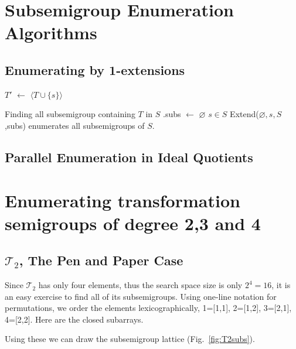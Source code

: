 \documentclass{amsart}
\newcommand{\cT}{{\mathcal T}}
\theoremstyle{plain}
\theoremstyle{definition}
\begin{document}
\section{Subsemigroup Enumeration Algorithms}

\subsection{Enumerating by 1-extensions}

\begin{algorithm}
\BlankLine
\Name{}

$T'$ $\leftarrow$ $\langle T\cup\{s\}\rangle$\\
\caption{Finding all subsemigroup containing $T$ in $S$ .\textsf{subs} $\leftarrow$ $\varnothing$ $s\in S$ \textsf{Extend}($\varnothing,s,S$,\textsf{subs}) enumerates all subsemigroups of $S$.}
\label{alg:1-extensons}
\end{algorithm}

\subsection{Parallel Enumeration in Ideal Quotients}

\section{Enumerating transformation semigroups of degree 2,3 and 4}

\subsection{$\cT_2$, The Pen and Paper Case}
Since $\cT_2$ has only four elements, thus the search space size is only $2^4=16$, it is an easy exercise to find all of its subsemigroups. 
Using one-line notation for permutations, we order the elements lexicographically, 1=[1,1], 2=[1,2], 3=[2,1], 4=[2,2]. Here are the closed subarrays.

Using these we can draw the subsemigroup lattice (Fig.\ \ref{fig:T2subs}).
\end{document}
